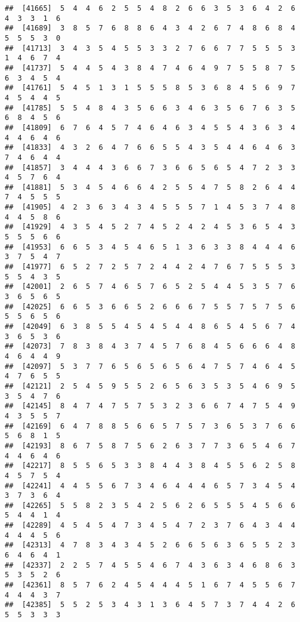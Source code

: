 \documentclass[
]{book}
\begin{document}
\begin{verbatim}
##  [41665]  5  4  4  6  2  5  5  4  8  2  6  6  3  5  3  6  4  2  6  4  3  3  1  6
##  [41689]  3  8  5  7  6  8  8  6  4  3  4  2  6  7  4  8  6  8  4  5  5  5  3  0
##  [41713]  3  4  3  5  4  5  5  3  3  2  7  6  6  7  7  5  5  5  3  1  4  6  7  4
##  [41737]  5  4  4  5  4  3  8  4  7  4  6  4  9  7  5  5  8  7  5  6  3  4  5  4
##  [41761]  5  4  5  1  3  1  5  5  5  8  5  3  6  8  4  5  6  9  7  4  5  4  4  5
##  [41785]  5  5  4  8  4  3  5  6  6  3  4  6  3  5  6  7  6  3  5  6  8  4  5  6
##  [41809]  6  7  6  4  5  7  4  6  4  6  3  4  5  5  4  3  6  3  4  4  4  6  4  6
##  [41833]  4  3  2  6  4  7  6  6  5  5  4  3  5  4  4  6  4  6  3  7  4  6  4  4
##  [41857]  3  4  4  4  3  6  6  7  3  6  6  5  6  5  4  7  2  3  3  4  5  7  6  4
##  [41881]  5  3  4  5  4  6  6  4  2  5  5  4  7  5  8  2  6  4  4  7  4  5  5  5
##  [41905]  4  2  3  6  3  4  3  4  5  5  5  7  1  4  5  3  7  4  8  4  4  5  8  6
##  [41929]  4  3  5  4  5  2  7  4  5  2  4  2  4  5  3  6  5  4  3  5  5  5  6  6
##  [41953]  6  6  5  3  4  5  4  6  5  1  3  6  3  3  8  4  4  4  6  3  7  5  4  7
##  [41977]  6  5  2  7  2  5  7  2  4  4  2  4  7  6  7  5  5  5  3  5  5  4  3  5
##  [42001]  2  6  5  7  4  6  5  7  6  5  2  5  4  4  5  3  5  7  6  3  6  5  6  5
##  [42025]  6  6  5  3  6  6  5  2  6  6  6  7  5  5  7  5  7  5  6  5  5  6  5  6
##  [42049]  6  3  8  5  5  4  5  4  5  4  4  8  6  5  4  5  6  7  4  3  6  5  3  6
##  [42073]  7  8  3  8  4  3  7  4  5  7  6  8  4  5  6  6  6  4  8  4  6  4  4  9
##  [42097]  5  3  7  7  6  5  6  5  6  5  6  4  7  5  7  4  6  4  5  4  7  6  5  5
##  [42121]  2  5  4  5  9  5  5  2  6  5  6  3  5  3  5  4  6  9  5  3  5  4  7  6
##  [42145]  8  4  7  4  7  5  7  5  3  2  3  6  6  7  4  7  5  4  9  4  3  5  5  7
##  [42169]  6  4  7  8  8  5  6  6  5  7  5  7  3  6  5  3  7  6  6  5  6  8  1  5
##  [42193]  8  6  7  5  8  7  5  6  2  6  3  7  7  3  6  5  4  6  7  4  4  6  4  6
##  [42217]  8  5  5  6  5  3  3  8  4  4  3  8  4  5  5  6  2  5  8  4  5  7  5  4
##  [42241]  4  4  5  5  6  7  3  4  6  4  4  4  6  5  7  3  4  5  4  3  7  3  6  4
##  [42265]  5  5  8  2  3  5  4  2  5  6  2  6  5  5  5  4  5  6  6  5  4  4  1  4
##  [42289]  4  5  4  5  4  7  3  4  5  4  7  2  3  7  6  4  3  4  4  4  4  4  5  6
##  [42313]  4  7  8  3  4  3  4  5  2  6  6  5  6  3  6  5  5  2  3  6  4  6  4  1
##  [42337]  2  2  5  7  4  5  5  4  6  7  4  3  6  3  4  6  8  6  3  5  3  5  2  6
##  [42361]  8  5  7  6  2  4  5  4  4  4  5  1  6  7  4  5  5  6  7  4  4  4  3  7
##  [42385]  5  5  2  5  3  4  3  1  3  6  4  5  7  3  7  4  4  2  6  5  5  3  3  3

\end{verbatim}
\end{document}
